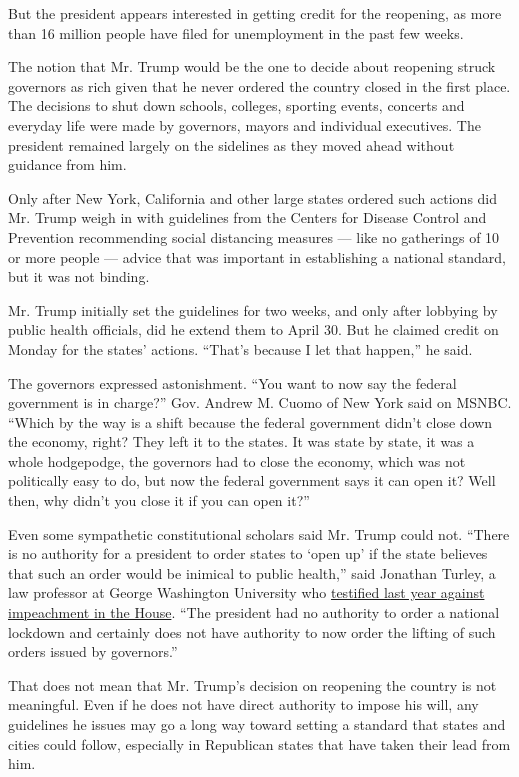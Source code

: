 But the president appears interested in getting credit for the
reopening, as more than 16 million people have filed for unemployment in
the past few weeks.

The notion that Mr. Trump would be the one to decide about reopening
struck governors as rich given that he never ordered the country closed
in the first place. The decisions to shut down schools, colleges,
sporting events, concerts and everyday life were made by governors,
mayors and individual executives. The president remained largely on the
sidelines as they moved ahead without guidance from him.

Only after New York, California and other large states ordered such
actions did Mr. Trump weigh in with guidelines from the Centers for
Disease Control and Prevention recommending social distancing measures
--- like no gatherings of 10 or more people --- advice that was
important in establishing a national standard, but it was not binding.

Mr. Trump initially set the guidelines for two weeks, and only after
lobbying by public health officials, did he extend them to April 30. But
he claimed credit on Monday for the states' actions. ``That's because I
let that happen,'' he said.

The governors expressed astonishment. ``You want to now say the federal
government is in charge?'' Gov. Andrew M. Cuomo of New York said on
MSNBC. ``Which by the way is a shift because the federal government
didn't close down the economy, right? They left it to the states. It was
state by state, it was a whole hodgepodge, the governors had to close
the economy, which was not politically easy to do, but now the federal
government says it can open it? Well then, why didn't you close it if
you can open it?''

Even some sympathetic constitutional scholars said Mr. Trump could not.
``There is no authority for a president to order states to `open up' if
the state believes that such an order would be inimical to public
health,'' said Jonathan Turley, a law professor at George Washington
University who
\href{https://www.nytimes3xbfgragh.onion/2019/12/04/us/politics/jonathan-turley.html}{testified
last year against impeachment in the House}. ``The president had no
authority to order a national lockdown and certainly does not have
authority to now order the lifting of such orders issued by governors.''

That does not mean that Mr. Trump's decision on reopening the country is
not meaningful. Even if he does not have direct authority to impose his
will, any guidelines he issues may go a long way toward setting a
standard that states and cities could follow, especially in Republican
states that have taken their lead from him.

